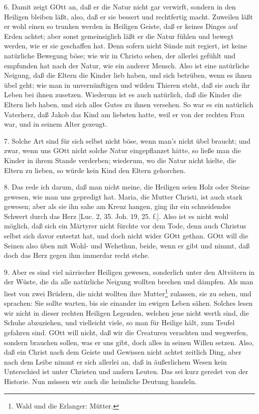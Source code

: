 6. Damit zeigt GOtt an, daß er die Natur nicht gar verwirft, sondern in den Heiligen bleiben läßt, also, daß er sie bessert und rechtfertig macht. Zuweilen läßt er wohl einen so trunken werden in Heiligen Geiste, daß er keines Dinges auf Erden achtet; aber sonst gemeinsiglich läßt er die Natur fühlen und bewegt werden, wie er sie geschaffen hat. Denn sofern nicht Sünde mit regiert, ist keine natürliche Bewegung böse; wie wir in Christo sehen, der allerlei gefühlt und empfunden hat nach der Natur, wie ein anderer Mensch. Also ist eine natürliche Neigung, daß die Eltern die Kinder lieb haben, und sich betrüben, wenn es ihnen übel geht; wie man
in unvernünftigen und wilden Thieren steht, daß sie auch ihr Leben bei ihnen zusetzen. Wiederum ist es auch natürlich, daß die Kinder die Eltern lieb haben, und sich alles Gutes zu ihnen versehen. So war es ein natürlich Vaterherz, daß Jakob das Kind am liebsten hatte, weil er von der rechten Frau war, und in seinem Alter gezeugt.

7. Solche Art sind für sich selbst nicht böse, wenn man’s nicht übel braucht; und zwar, wenn uns GOtt nicht solche Natur eingepflanzet hätte, so ließe man die Kinder in ihrem Stande verderben; wiederum, wo die Natur nicht hielte, die Eltern zu lieben, so würde kein Kind den Eltern gehorchen.

8. Das rede ich darum, daß man nicht meine, die Heiligen seien Holz oder Steine gewesen, wie man uns gepredigt hat. Maria, die Mutter Christi, ist auch stark gewesen; aber als sie ihn sahe am Kreuz hangen, ging ihr ein schneidendes Schwert durch das Herz [Luc. 2, 35. Joh. 19, 25. f.]. Also ist es nicht wohl möglich, daß sich ein Märtyrer nicht fürchte vor dem Tode, denn auch Christus selbst sich davor entsetzt hat, und doch nicht wider GOtt gethan. GOtt will die Seinen also üben mit Wohl- und Wehethun, beide, wenn er gibt und nimmt, daß doch das Herz gegen ihm immerdar recht stehe.

9. Aber es sind viel närrischer Heiligen gewesen, sonderlich unter den Altvätern in der Wüste, die da alle natürliche Neigung wollten brechen und dämpfen. Als man liest von zwei Brüdern, die nicht wollten ihre Mutter\footnote{Wald und die Erlanger: Mütter.} zulassen, sie zu sehen, und sprachen: Sie sollte warten, bis sie einander im ewigen Leben sähen. Solches lesen wir nicht in dieser rechten Heiligen Legenden, welchen jene nicht werth sind, die Schuhe abzuziehen, und vielleicht viele, so man für Heilige hält, zum Teufel gefahren sind. GOtt will nicht, daß wir die Creaturen verachten und wegwerfen, sondern brauchen sollen, was er uns gibt, doch alles in seinen Willen setzen. Also, daß ein Christ nach dem Geiste und Gewissen nicht achtet zeitlich Ding, aber nach dem Leibe nimmt er sich allerlei an, daß in äußerlichem Wesen kein Unterschied ist unter Christen und andern Leuten. Das sei kurz geredet von der Historie. Nun müssen wir auch die heimliche Deutung handeln.


